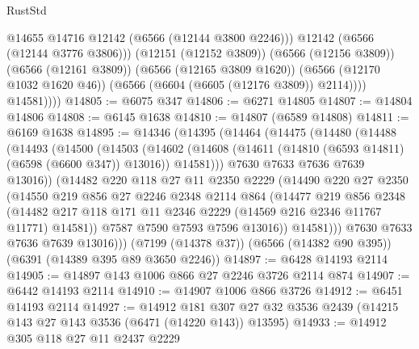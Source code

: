 \begin{lexlean}{RustStd}
\begin{coremodule}
{\begin{coremodule}
{{{{{{{{{{{{{{{{{{{{{{{{{{                    @14655
                    @14716
                    @12142
                    (@6566 (@12144 @3800 @2246)))
                  @12142
                  (@6566 (@12144 @3776 @3806)))
                (@12151 (@12152 @3809))
                (@6566 (@12156 @3809))
                (@6566 (@12161 @3809))
                (@6566 (@12165 @3809 @1620))
                (@6566 (@12170 @1032 @1620 @46))
                (@6566 (@6604 (@6605 (@12176 @3809)) @2114))))
            @14581))))
@14805 := @6075 @347
@14806 := @6271 @14805
@14807 := @14804 @14806
@14808 := @6145 @1638
@14810 := @14807 (@6589 @14808)
@14811 := @6169 @1638
@14895 := @14346
    (@14395
      (@14464
        (@14475
          (@14480
            (@14488
              (@14493
                (@14500
                  (@14503
                    (@14602
                      (@14608 (@14611 (@14810 (@6593 @14811) (@6598 (@6600 @347)) @13016)) @14581)))
                  @7630
                  @7633
                  @7636
                  @7639
                  @13016))
              (@14482
                @220
                @118
                @27
                @11
                @2350
                @2229
                (@14490
                  @220
                  @27
                  @2350
                  (@14550
                    @219
                    @856
                    @27
                    @2246
                    @2348
                    @2114
                    @864
                    (@14477
                      @219
                      @856
                      @2348
                      (@14482
                        @217
                        @118
                        @171
                        @11
                        @2346
                        @2229
                        (@14569 @216 @2346 @11767 @11771)
                        @14581))
                    @7587
                    @7590
                    @7593
                    @7596
                    @13016))
                @14581)))
          @7630
          @7633
          @7636
          @7639
          @13016)))
    (@7199 (@14378 @37))
    (@6566 (@14382 @90 @395))
    (@6391 (@14389 @395 @89 @3650 @2246))
@14897 := @6428 @14193 @2114
@14905 := @14897 @143 @1006 @866 @27 @2246 @3726 @2114 @874
@14907 := @6442 @14193 @2114
@14910 := @14907 @1006 @866 @3726
@14912 := @6451 @14193 @2114
@14927 := @14912
    @181
    @307
    @27
    @32
    @3536
    @2439
    (@14215 @143 @27 @143 @3536 (@6471 (@14220 @143)) @13595)
@14933 := @14912 @305 @118 @27 @11 @2437 @2229
}}}}}}}}}}}}}}}}}}}}}}}}}}
\end{coremodule}}
\end{coremodule}
\end{lexlean}
